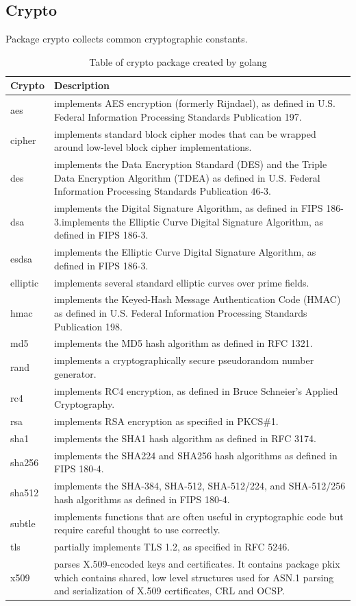 \documentclass[
  digital, %
  notable,   %
  lof,     %
  lot,     %
]{fithesis3}
\begin{document}
\subsection{Crypto}
Package crypto collects common cryptographic constants.

\begin{table}[th]
\begin{tabular}{|p{1.5cm} p{10.5cm}|}
\hline
Crypto & Description \\
\hline
aes & implements AES encryption (formerly Rijndael), as defined in U.S. Federal Information Processing Standards Publication 197. \\
cipher & implements standard block cipher modes that can be wrapped around low-level block cipher implementations. \\
des &  implements the Data Encryption Standard (DES) and the Triple Data Encryption Algorithm (TDEA) as defined in U.S. Federal Information Processing Standards Publication 46-3. \\
dsa &  implements the Digital Signature Algorithm, as defined in FIPS 186-3.implements the Elliptic Curve Digital Signature Algorithm, as defined in FIPS 186-3.\\
esdsa & implements the Elliptic Curve Digital Signature Algorithm, as defined in FIPS 186-3. \\
elliptic &  implements several standard elliptic curves over prime fields. \\
hmac & implements the Keyed-Hash Message Authentication Code (HMAC) as defined in U.S. Federal Information Processing Standards Publication 198. \\
md5 & implements the MD5 hash algorithm as defined in RFC 1321. \\
rand & implements a cryptographically secure pseudorandom number generator.\\
rc4 &  implements RC4 encryption, as defined in Bruce Schneier's Applied Cryptography.\\
rsa & implements RSA encryption as specified in PKCS\#1. \\
sha1 & implements the SHA1 hash algorithm as defined in RFC 3174.\\
sha256 & implements the SHA224 and SHA256 hash algorithms as defined in FIPS 180-4. \\
sha512 & implements the SHA-384, SHA-512, SHA-512/224, and SHA-512/256 hash algorithms as defined in FIPS 180-4.\\
subtle & implements functions that are often useful in cryptographic code but require careful thought to use correctly.\\
tls & partially implements TLS 1.2, as specified in RFC 5246. \\
x509 & parses X.509-encoded keys and certificates. It contains package pkix which contains shared, low level structures used for ASN.1 parsing and serialization of X.509 certificates, CRL and OCSP. \\ 
\hline
\end{tabular}
\caption{Table of crypto package created by golang} 
\label{table:crypto} 
\end{table}
\end{document}
